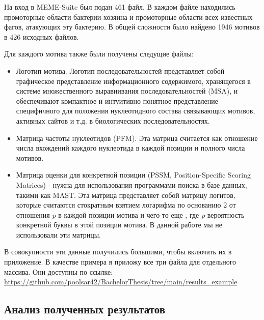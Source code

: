 \documentclass[14pt]{extarticle}
\begin{document}
    
    \par{На вход в MEME-Suite был подан 461 файл. В каждом файле находились промоторные области бактерии-хозяина и 
    промоторные области всех известных \cite{virus-host} фагов, атакующих эту бактерию. В общей сложности было найдено 
    1946 мотивов в 426 исходных файлов.}
    
    \par{Для каждого мотива также были получены следущие файлы: }
    
    \begin{itemize}
    \item Логотип мотива. Логотип последовательностей представляет собой графическое представление информационного
    содержимого, хранящегося в системе множественного выравнивания последовательностей (MSA), и обеспечивают
    компактное и интуитивно понятное представление специфичного для положения нуклеотидного состава связывающих
    мотивов, активных сайтов и т.д. в биологических последовательностях.
   
    \item Матрица частоты нуклеотидов (PFM). Эта матрица считается как отношение числа вхождений каждого нуклеотида в 
    каждой позиции и полного числа мотивов. 
    
    \item Матрица оценки для конкретной позиции (PSSM, Position-Specific Scoring Matrices) - нужна для использования 
    программами поиска в базе данных, такими как MAST. Эта матрица представляет собой матрицу логитов, которые считаются
    стократным взятием логарифма по основанию 2 от отношения \textit{p} в каждой позиции мотива и чего-то еще 
    \cite{memeres}, где \textit{p}-вероятность конкретной буквы в этой позиции мотива. В данной работе мы не 
    использовали эти матрицы.  
    \end{itemize}
    
    \par{В совокупности эти данные получились большими, чтобы включать их в приложение. В качестве примера я приложу все три файла для отдельного массива. Они доступны по 
    ссылке: \url{https://github.com/poolsar42/BachelorThesis/tree/main/results_example}}
    
    \begin{center}
    \subsection{Анализ полученных результатов}
    \end{center}
    
\end{document}
